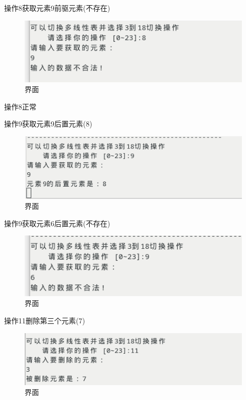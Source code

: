 \documentclass[supercite]{Experimental_Report}
\theoremstyle{definition}
\begin{document}
操作8获取元素9前驱元素(不存在)

\begin{figure}[!htb]
	\begin{center}
		\includegraphics[scale=0.60]{images/1-19.png}
		\caption{界面}
		\label{fig1-19}
		\end{center}
\end{figure}

操作8正常

操作9获取元素9后置元素(8)

\begin{figure}[!htb]
	\begin{center}
		\includegraphics[scale=0.60]{images/1-20.png}
		\caption{界面}
		\label{fig1-20}
		\end{center}
\end{figure}

操作9获取元素6后置元素(不存在)

\begin{figure}[!htb]
	\begin{center}
		\includegraphics[scale=0.60]{images/1-21.png}
		\caption{界面}
		\label{fig1-21}
		\end{center}
\end{figure}

操作11删除第三个元素(7)

\begin{figure}[!htb]
	\begin{center}
		\includegraphics[scale=0.60]{images/1-22.png}
		\caption{界面}
		\label{fig1-22}
		\end{center}
\end{figure}
\end{document}
